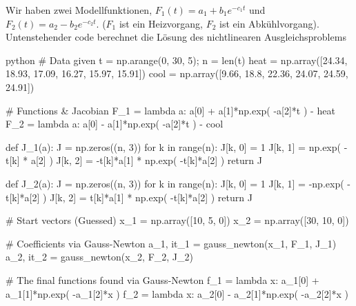 \newpage
{}
\inlineex Wir haben zwei Modellfunktionen, $F_1(t) = a_1 + b_1 e^{-c_1 t}$ und $F_2(t) = a_2 - b_2 e^{-c_2 t}$. ($F_1$ ist ein Heizvorgang, $F_2$ ist ein Abkühlvorgang).
Untenstehender code berechnet die Lösung des nichtlinearen Ausgleichsproblems
\begin{code}{python}
# Data given
t = np.arange(0, 30, 5); n = len(t)
heat = np.array([24.34, 18.93, 17.09, 16.27, 15.97, 15.91])
cool = np.array([9.66, 18.8, 22.36, 24.07, 24.59, 24.91])

# Functions & Jacobian
F_1 = lambda a: a[0] + a[1]*np.exp( -a[2]*t ) - heat
F_2 = lambda a: a[0] - a[1]*np.exp( -a[2]*t ) - cool 

def J_1(a):
    J = np.zeros((n, 3))
    for k in range(n):
        J[k, 0] = 1
        J[k, 1] = np.exp( -t[k] * a[2] )
        J[k, 2] = -t[k]*a[1] * np.exp( -t[k]*a[2] )
    return J

def J_2(a):
    J = np.zeros((n, 3))
    for k in range(n):
        J[k, 0] = 1
        J[k, 1] = -np.exp( -t[k]*a[2] )
        J[k, 2] = t[k]*a[1] * np.exp( -t[k]*a[2] )
    return J 

# Start vectors (Guessed)
x_1 = np.array([10, 5, 0])
x_2 = np.array([30, 10, 0])

# Coefficients via Gauss-Newton
a_1, it_1 = gauss_newton(x_1, F_1, J_1)
a_2, it_2 = gauss_newton(x_2, F_2, J_2)

# The final functions found via Gauss-Newton
f_1 = lambda x: a_1[0] + a_1[1]*np.exp( -a_1[2]*x )
f_2 = lambda x: a_2[0] - a_2[1]*np.exp( -a_2[2]*x )
\end{code}
